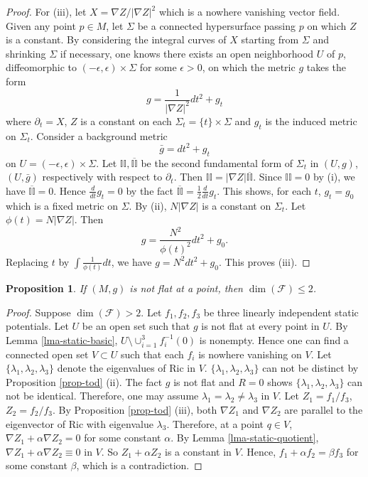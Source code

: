 \documentclass[12pt]{amsart}
\newtheorem{prop}{Proposition}[section]
\theoremstyle{remark}
\numberwithin{equation}{section}
\newcommand{\Ric}{\mbox{Ric}}
\newcommand{\bee}{\begin{equation*}}
\newcommand{\eee}{\end{equation*}}
\def\p{\partial}
\def\Pi{\displaystyle{\mathbb{II}}}
\def\K{\mathcal{F}}
\def\a{\alpha}
\begin{document}
\begin{proof}
For  (iii),  let  $ X =  \nabla Z / | \nabla Z|^2 $ which is a nowhere vanishing vector field.
Given any point $ p \in M$, let $ \Sigma$ be a connected  hypersurface passing $p$ on which $ Z$ is a constant.
By considering the integral curves of $X$ starting from $\Sigma$ and shrinking $ \Sigma$ if necessary,
one knows  there exists  an open  neighborhood $U$ of $p$,
diffeomorphic to $ (-\epsilon, \epsilon) \times \Sigma $ for some $\epsilon > 0$,
on which the metric $g$ takes the form
$$ g = \frac{1}{| \nabla Z |^2}  d t^2 + g_t  $$
where $ \p_t =  X $,  $Z$ is a constant on each $\Sigma_t =  \{ t \} \times \Sigma $
and  $ g_t $ is the induced metric on $ \Sigma_t$.
Consider a background metric
$$
\bar{g} = d t^2 + g_t
$$
on $ U =  (-\epsilon, \epsilon) \times  \Sigma $.
Let $\Pi, \overline{\Pi}$ be the second fundamental form of $\Sigma_t $ in $(U, g)$, $(U, \bar{g})$ respectively with respect to $\p_t$. Then
$ \Pi = | \nabla Z | \overline{\Pi} . $
Since  $ \Pi = 0 $ by (i),  we have $ \overline{\Pi} = 0 $.
Hence $  \frac{d}{dt} g_t = 0 $ by the fact  $  \overline{\Pi} = \frac12 \frac{d}{dt} g_t $.
This shows, for each $t$, $g_t  = g_0$ which is  a fixed metric on $\Sigma$.
By (ii), $  N | \nabla Z |  $ is a constant on  $ \Sigma_t $.
Let  $ \phi (t) =  N | \nabla Z |   $.
Then
\bee
g = \frac{N^2}{ \phi (t)^2} d t^2 + g_0 .
\eee
Replacing  $ t $ by $ \int \frac{1}{\phi(t)} d t $, we have
$ g = N^2 d t^2 + g_0 $. This proves (iii).
\end{proof}




\begin{prop}\label{prop-Static-dim}  If $(M, g)$ is not flat at a point, then $\dim(\K)\le 2$.
\end{prop}
\begin{proof}
Suppose $\dim(\K)>2$. Let $f_1,f_2,f_3$ be three linearly independent static potentials.
 Let $ U  $ be an open set such that  $g $ is not flat at every point in $U$.  By Lemma \ref{lma-static-basic},  $U\setminus\cup_{i=1}^3f_i^{-1}(0)$ is nonempty. Hence
one can find a connected open set $V \subset U$ such that each $f_i$ is nowhere vanishing on $V$. Let $\{ \lambda_1,  \lambda_2,  \lambda_3 \}$ denote the eigenvalues of $\Ric$ in $V$.   $ \{ \lambda_1, \lambda_2, \lambda_3 \}$ can not be distinct by Proposition \ref{prop-tod}  (ii).
The fact $ g $ is not flat  and $ R  = 0$ shows $ \{ \lambda_1, \lambda_2, \lambda_3 \}$ can not be identical.
Therefore,
one may assume  $\lambda_1=\lambda_2 \neq \lambda_3$ in $V$.
Let $Z_1=f_1/f_3$, $Z_2=f_2/f_3$.
By Proposition \ref{prop-tod} (iii), both $\nabla Z_1$ and $\nabla Z_2$ are parallel to the
eigenvector of $ \Ric$   with eigenvalue $\lambda_3$.
Therefore,  at a point $q\in V$, $\nabla Z_1+\a\nabla Z_2=0$ for some constant $ \alpha$.  By Lemma \ref{lma-static-quotient}, $\nabla Z_1+\a\nabla Z_2\equiv0$ in $V$. So $Z_1+\a Z_2$ is a constant in $V$. Hence, $f_1+\a f_2=\beta f_3$ for some constant $\beta$, which is a contradiction.
\end{proof}
\end{document}

